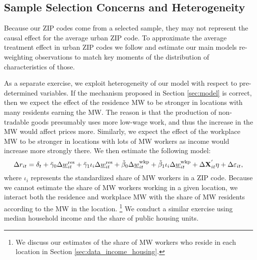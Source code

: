 \subsection{Sample Selection Concerns and Heterogeneity}\label{sec:emp_start_heterogeneity}

Because our ZIP codes come from a selected sample, they may not represent
the causal effect for the average urban ZIP code.
To approximate the average treatment effect in urban ZIP codes we follow
\textcite{Hainmueller2012} and estimate our main models re-weighting 
observations to match key moments of the distribution of characteristics of 
those.

As a separate exercise, we exploit heterogeneity of our model with respect
to pre-determined variables.
If the mechanism proposed in Section \ref{sec:model} is correct, then we
expect the effect of the residence MW to be stronger in locations with many 
residents earning the MW.
The reason is that the production of non-tradable goods presumably uses more
low-wage work, and thus the increase in the MW would affect prices more.
Similarly, we expect the effect of the workplace MW to be stronger in locations
with lots of MW workers as income would increase more strongly there.
We then estimate the following model:
\begin{equation}\label{eq:fd_heterogeneity}
    \Delta r_{it} = \delta_t
                  + \tilde\gamma_0 \Delta \underline{w}^{\text{res}}_{it}
                  + \tilde\gamma_1 \iota_i \Delta \underline{w}^{\text{res}}_{it}
                  + \tilde\beta_0 \Delta \underline{w}^{\text{wkp}}_{it}
                  + \tilde\beta_1 \iota_i \Delta \underline{w}^{\text{wkp}}_{it}
                  + \Delta \mathbf{X}^{'}_{it}\eta
                  + \Delta \varepsilon_{it} ,
\end{equation}
where $\iota_i$ represents the standardized share of MW workers in a ZIP code.
Because we cannot estimate the share of MW workers working in a given location,
we interact both the residence and workplace MW with the share of MW residents
according to the MW in the location.%
\footnote{We discuss our estimates of the share of MW workers who reside in each 
location in Section \ref{sec:data_income_housing}.}
We conduct a similar exercise using median household income and the share of 
public housing units.
